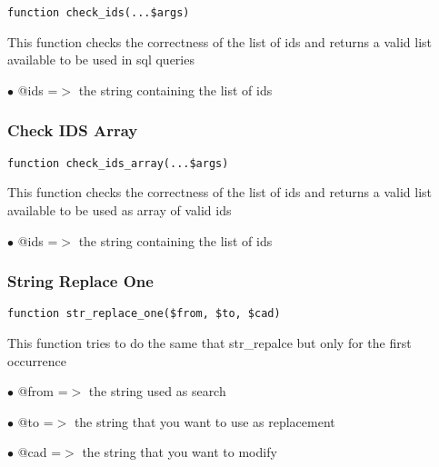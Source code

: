 \documentclass[a4paper]{article}
\begin{document}
\begin{lstlisting}
function check_ids(...$args)
\end{lstlisting}

This function checks the correctness of the list of ids and returns a valid
list available to be used in sql queries

\begin{compactitem}
\item[\color{myblue}$\bullet$] @ids =$>$ the string containing the list of ids
\end{compactitem}

\hypertarget{toc252}{}
\subsubsection{Check IDS Array}

\begin{lstlisting}
function check_ids_array(...$args)
\end{lstlisting}

This function checks the correctness of the list of ids and returns a valid
list available to be used as array of valid ids

\begin{compactitem}
\item[\color{myblue}$\bullet$] @ids =$>$ the string containing the list of ids
\end{compactitem}

\hypertarget{toc253}{}
\subsubsection{String Replace One}

\begin{lstlisting}
function str_replace_one($from, $to, $cad)
\end{lstlisting}

This function tries to do the same that str\_repalce but only for the first
occurrence

\begin{compactitem}
\item[\color{myblue}$\bullet$] @from =$>$ the string used as search
\item[\color{myblue}$\bullet$] @to   =$>$ the string that you want to use as replacement
\item[\color{myblue}$\bullet$] @cad  =$>$ the string that you want to modify
\end{compactitem}
\end{document}
